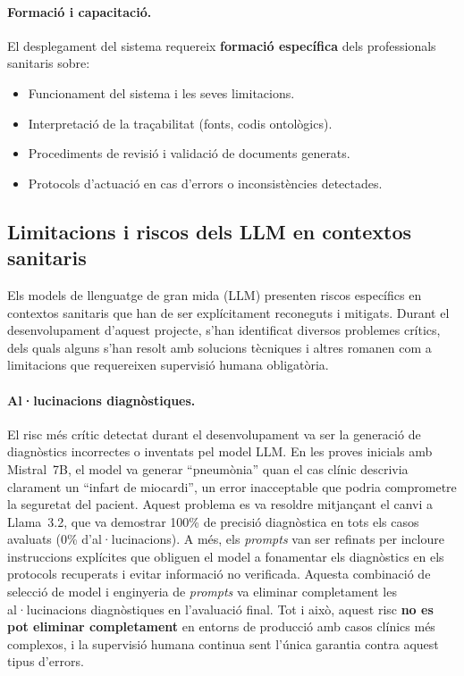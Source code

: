 \documentclass[CAT]{TFUOC}%
\begin{document}
\paragraph{Formació i capacitació.}
El desplegament del sistema requereix \textbf{formació específica} dels professionals sanitaris sobre:
\begin{itemize}
    \item Funcionament del sistema i les seves limitacions.
    \item Interpretació de la traçabilitat (fonts, codis ontològics).
    \item Procediments de revisió i validació de documents generats.
    \item Protocols d'actuació en cas d'errors o inconsistències detectades.
\end{itemize}

\subsection{Limitacions i riscos dels LLM en contextos sanitaris}

Els models de llenguatge de gran mida (LLM) presenten riscos específics en contextos sanitaris que han de ser explícitament reconeguts i mitigats. Durant el desenvolupament d'aquest projecte, s'han identificat diversos problemes crítics, dels quals alguns s'han resolt amb solucions tècniques i altres romanen com a limitacions que requereixen supervisió humana obligatòria.

\paragraph{Al·lucinacions diagnòstiques.}
El risc més crític detectat durant el desenvolupament va ser la generació de diagnòstics incorrectes o inventats pel model LLM. En les proves inicials amb Mistral~7B, el model va generar ``pneumònia'' quan el cas clínic descrivia clarament un ``infart de miocardi'', un error inacceptable que podria comprometre la seguretat del pacient. Aquest problema es va resoldre mitjançant el canvi a Llama~3.2, que va demostrar 100\% de precisió diagnòstica en tots els casos avaluats (0\% d'al·lucinacions). A més, els \textit{prompts} van ser refinats per incloure instruccions explícites que obliguen el model a fonamentar els diagnòstics en els protocols recuperats i evitar informació no verificada. Aquesta combinació de selecció de model i enginyeria de \textit{prompts} va eliminar completament les al·lucinacions diagnòstiques en l'avaluació final. Tot i això, aquest risc \textbf{no es pot eliminar completament} en entorns de producció amb casos clínics més complexos, i la supervisió humana continua sent l'única garantia contra aquest tipus d'errors.
\end{document}
